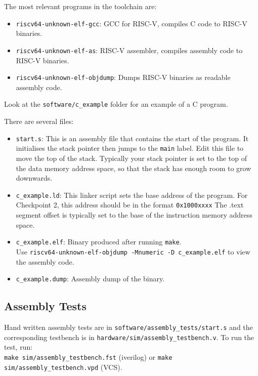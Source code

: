 \documentclass[11pt]{article}
\begin{document}
The most relevant programs in the toolchain are:
\begin{itemize}
    \item \verb|riscv64-unknown-elf-gcc|: GCC for RISC-V, compiles C code to RISC-V binaries.
    \item \verb|riscv64-unknown-elf-as|: RISC-V assembler, compiles assembly code to RISC-V binaries.
    \item \verb|riscv64-unknown-elf-objdump|: Dumps RISC-V binaries as readable assembly code.
\end{itemize}

Look at the \verb|software/c_example| folder for an example of a C program.

There are several files:
\begin{itemize}
    \item \verb|start.s|: This is an assembly file that contains the start of the program.
      It initialises the stack pointer then jumps to the \verb|main| label.
      Edit this file to move the top of the stack.
      Typically your stack pointer is set to the top of the data memory address space, so that the stack has enough room to grow downwards.

    \item \verb|c_example.ld|: This linker script sets the base address of the program.
      For Checkpoint 2, this address should be in the format \verb|0x1000xxxx|
      The .text segment offset is typically set to the base of the instruction memory address space.

    \item \verb|c_example.elf|: Binary produced after running \verb|make|.\\Use \verb|riscv64-unknown-elf-objdump -Mnumeric -D c_example.elf| to view the assembly code.
    \item \verb|c_example.dump|: Assembly dump of the binary.
\end{itemize}

\subsection{Assembly Tests}
\label{assembly_tests}
Hand written assembly tests are in \verb|software/assembly_tests/start.s| and the corresponding testbench is in \verb|hardware/sim/assembly_testbench.v|.
To run the test, run:\\
\verb|make sim/assembly_testbench.fst| (iverilog) or \verb|make sim/assembly_testbench.vpd| (VCS).
\end{document}
